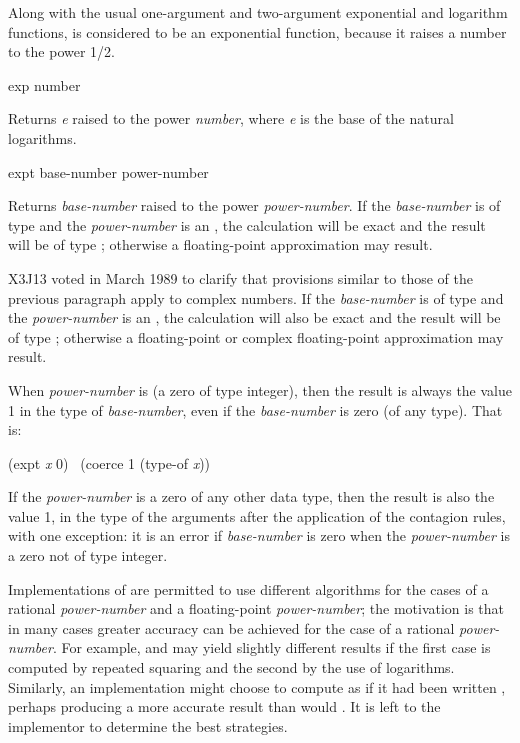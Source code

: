 Along with the usual one-argument and two-argument exponential and
logarithm functions,  is considered to be an exponential
function, because it raises a number to the power 1/2.

\begin{defun}[Function]
exp number

Returns {\it e} raised to the power {\it number},
where {\it e} is the base of the natural logarithms.
\end{defun}

\begin{defun}[Function]
expt base-number power-number

Returns {\it base-number} raised to the power {\it power-number}.
If the {\it base-number} is of type  and the {\it power-number} is
an ,
the calculation will be exact and the result will be of type ;
otherwise a floating-point approximation may result.

\begin{newer}
X3J13 voted in March 1989
to clarify that provisions similar to those of the previous paragraph apply to complex
numbers.  If the {\it base-number} is of type 
and the {\it power-number} is
an ,
the calculation will also be exact and the result will be of type
;
otherwise a floating-point or complex floating-point approximation may result.
\end{newer}

When {\it power-number} is  (a zero of type integer),
then the result is always the value 1 in the type of {\it base-number},
even if the {\it base-number} is zero (of any type).  That is:
\begin{lisp}
(expt {\it x} 0) \EQ\ (coerce 1 (type-of {\it x}))
\end{lisp}
If the {\it power-number} is a zero of any other data type,
then the result is also the value 1, in the type of the arguments
after the application of the contagion rules, with one exception:
it is an error if {\it base-number} is zero when the {\it power-number}
is a zero not of type integer.

Implementations of  are permitted to use different algorithms
for the cases of a rational {\it power-number} and a floating-point
{\it power-number}; the motivation is that in many cases greater accuracy
can be achieved for the case of a rational {\it power-number}.
For example,  and  may yield
slightly different results if the first case is computed by repeated squaring
and the second by the use of logarithms.  Similarly, an implementation
might choose to compute  as if it had
been written , perhaps producing a more accurate
result than would .  It is left to the implementor
to determine the best strategies.


\end{defun}
